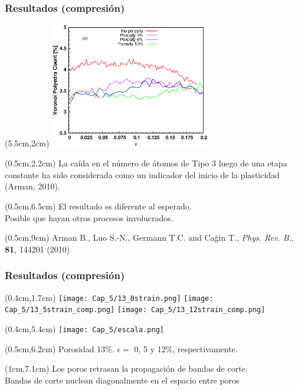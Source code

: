\begin{frame}
    \frametitle{Resultados (compresi\'on)}
    \begin{textblock*}{7cm}(5.5cm,2cm)
        \includegraphics[width=7cm]{Presentacion_PANACM_Franco/tipe3_strain_comp.eps}
    \end{textblock*}
    \begin{textblock*}{4.8cm}(0.5cm,2.2cm)
        La ca\'ida en el n\'umero de \'atomos de Tipo 3 luego de una etapa constante ha sido considerada como un indicador del inicio de la plasticidad (Arman, 2010).
    \end{textblock*}
    \begin{textblock*}{4.8cm}(0.5cm,6.5cm)
        El resultado es diferente al esperado.\\%
        Posible que hayan otros procesos involucrados.
    \end{textblock*}
    \begin{textblock*}{12cm}(0.5cm,9cm) %
        \scriptsize{Arman B., Luo S.-N., Germann T.C. and Cağin T., \textit{Phys. Rev. B.}, \textbf{81}, 144201 (2010)}
    \end{textblock*}
\end{frame}

\begin{frame}
    \frametitle{Resultados (compresi\'on)}
    \begin{textblock*}{12cm}(0.4cm,1.7cm)
        \texttt{[image: Cap\_5/13\_0strain.png]}
        \texttt{[image: Cap\_5/13\_5strain\_comp.png]}
        \texttt{[image: Cap\_5/13\_12strain\_comp.png]}\\
    \end{textblock*}
    \begin{textblock*}{12cm}(0.4cm,5.4cm)
     \centering
        \texttt{[image: Cap\_5/escala.png]}
    \end{textblock*}
    \begin{textblock*}{12cm}(0.5cm,6.2cm)
        \centering
        \scriptsize{Porosidad 13\%. $\epsilon=$ 0, 5 y 12\%, respectivamente.}
    \end{textblock*}
    \begin{textblock*}{11cm}(1cm,7.1cm)
      \centering
        Los poros retrasan la propagaci\'on de bandas de corte.\\
        Bandas de corte nuclean diagonalmente en el espacio entre poros
    \end{textblock*}
\end{frame}


